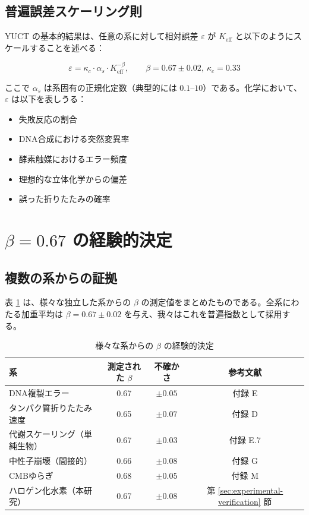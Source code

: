 \documentclass[11pt,a4paper]{article}
\newcommand{\Keff}{K_{\mathrm{eff}}}
\newcommand{\kappac}{\kappa_c}
\newcommand{\eps}{\varepsilon}
\begin{document}
	\subsection{普遍誤差スケーリング則}
	
	YUCT の基本的結果は、任意の系に対して相対誤差 $\eps$ が $\Keff$ と以下のようにスケールすることを述べる：
	
	\begin{equation}
		\boxed{\eps = \kappac \cdot \alpha_s \cdot \Keff^{-\beta}, \qquad \beta = 0.67 \pm 0.02, \ \kappac = 0.33}
		\label{eq:universal-error}
	\end{equation}
	
	ここで $\alpha_s$ は系固有の正規化定数（典型的には $0.1$--$10$）である。化学において、$\eps$ は以下を表しうる：
	\begin{itemize}
		\item 失敗反応の割合
		\item DNA合成における突然変異率
		\item 酵素触媒におけるエラー頻度
		\item 理想的な立体化学からの偏差
		\item 誤った折りたたみの確率
	\end{itemize}
	
	\section{$\beta = 0.67$ の経験的決定}
	\label{sec:empirical-beta}
	
	\subsection{複数の系からの証拠}
	
	表 \ref{tab:beta-empirical} は、様々な独立した系からの $\beta$ の測定値をまとめたものである。全系にわたる加重平均は $\beta = 0.67 \pm 0.02$ を与え、我々はこれを普遍指数として採用する。
	
	\begin{table}[htbp]
		\centering
		\caption{様々な系からの $\beta$ の経験的決定}
		\label{tab:beta-empirical}
		\begin{tabular}{lccc}
			\toprule
			系 & 測定された $\beta$ & 不確かさ & 参考文献 \\
			\midrule
			DNA複製エラー & 0.67 & $\pm 0.05$ & 付録 E \\
			タンパク質折りたたみ速度 & 0.65 & $\pm 0.07$ & 付録 D \\
			代謝スケーリング（単純生物） & 0.67 & $\pm 0.03$ & 付録 E.7 \\
			中性子崩壊（間接的） & 0.66 & $\pm 0.08$ & 付録 G \\
			CMBゆらぎ & 0.68 & $\pm 0.05$ & 付録 M \\
			ハロゲン化水素（本研究） & 0.67 & $\pm 0.08$ & 第 \ref{sec:experimental-verification} 節 \\
			\bottomrule
		\end{tabular}
	\end{table}
	
\end{document}

